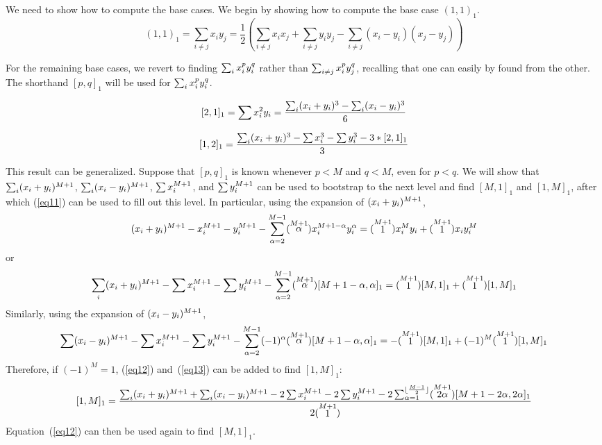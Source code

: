 We need to show how to compute the base cases.
We begin by showing how to compute the base case $(1,1)_{1}$.
\[ (1,1)_{1} = \sum_{i \neq j} x_{i}y_{j} = 
\frac{1}{2} (\sum_{i \neq j} x_{i}x_{j} + \sum_{i \neq j} y_{i}y_{j} 
	     - \sum_{i \neq j} (x_{i} - y_{i})(x_{j} - y_{j})) \]

For the remaining base cases, we revert to finding $\sum_{i} x_{i}^{p}y_{i}^{q}$
rather than $\sum_{i \neq j} x_{i}^{p}y_{j}^{q}$,
recalling that one can easily by found from the other.
The shorthand $[p,q]_{1}$ will be used for $\sum_{i} x_{i}^{p}y_{i}^{q}$.

\[ [2,1]_{1} = \sum x_{i}^{2} y_{i} 
	     = \frac{\sum_{i}(x_{i} + y_{i})^{3} - \sum_{i}(x_{i} - y_{i})^{3}}{6} \]

\[ [1,2]_{1} = 
   \frac{\sum_{i}(x_{i} + y_{i})^{3} - \sum x_{i}^{3} - \sum y_{i}^{3} - 3*[2,1]_{1}}{3} \]

This result can be generalized.
Suppose that $[p,q]_{1}$ is known whenever $p < M$ and $q < M$, 
even for $p < q$.
We will show that 
$\sum_{i}(x_{i}+y_{i})^{M+1}$, 
$\sum_{i}(x_{i}-y_{i})^{M+1}$, $\sum x_{i}^{M+1}$, and $\sum y_{i}^{M+1}$
can be used 
to bootstrap to the next level and find $[M,1]_{1}$ and $[1,M]_{1}$,
after which (\ref{eq11}) can be used to fill out this level.
In particular, using the expansion of $(x_{i}+y_{i})^{M+1}$,
\[ (x_{i}+y_{i})^{M+1} - x_{i}^{M+1} - y_{i}^{M+1} 
	- \sum_{\alpha = 2}^{M-1} (\stackrel{M+1}{\alpha}) x_{i}^{M+1-\alpha}y_{i}^{\alpha}
   = (\stackrel{M+1}{1}) x_{i}^{M}y_{i} + (\stackrel{M+1}{1}) x_{i}y_{i}^{M}
\]
or
\begin{equation}
\label{eq12}
\scriptsize{
\sum_{i} (x_{i}+y_{i})^{M+1} - \sum x_{i}^{M+1} - \sum y_{i}^{M+1} 
	- \sum_{\alpha = 2}^{M-1} (\stackrel{M+1}{\alpha}) [M+1-\alpha,\alpha]_{1}
   = (\stackrel{M+1}{1}) [M,1]_{1} + (\stackrel{M+1}{1}) [1,M]_{1}
}
\end{equation}
Similarly, using the expansion of $(x_{i}-y_{i})^{M+1}$,
\begin{equation}
\label{eq13}
\scriptsize{
\sum (x_{i}-y_{i})^{M+1} - \sum x_{i}^{M+1} - \sum y_{i}^{M+1}
   - \sum_{\alpha = 2}^{M-1} (-1)^{\alpha} (\stackrel{M+1}{\alpha}) [M+1-\alpha,\alpha]_{1}
   = - (\stackrel{M+1}{1}) [M,1]_{1} + (-1)^{M} (\stackrel{M+1}{1}) [1,M]_{1}
}
\end{equation}
Therefore, if $(-1)^{M} = 1$, (\ref{eq12}) and~(\ref{eq13}) 
can be added to find $[1,M]_{1}$:
\begin{equation}
\label{eq14}
\scriptsize{
[1,M]_{1} = \frac{\sum_{i} (x_{i}+y_{i})^{M+1} + \sum_{i} (x_{i}-y_{i})^{M+1} - 
	2\sum x_{i}^{M+1} - 2\sum y_{i}^{M+1} 
	- 2\sum_{\alpha = 1}^{\lfloor \frac{M-1}{2} \rfloor} (\stackrel{M+1}{2\alpha}) 
		[M+1-2\alpha,2\alpha]_{1}}{2 (\stackrel{M+1}{1})}
}
\end{equation}
Equation~(\ref{eq12}) can then be used again to find $[M,1]_{1}$.

